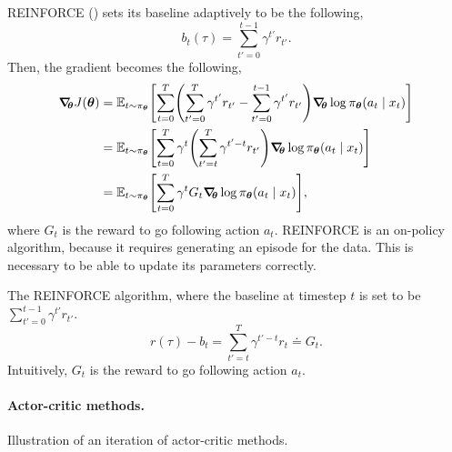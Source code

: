 REINFORCE () sets its baseline adaptively to be the
following, \[
  b_t(\tau) = \sum_{t'=0}^{t-1} \gamma^{t'} r_{t'}
.\]
Then, the gradient becomes the following, 
\begin{align*}
  \grad{J(\vec{\theta})}{\vec{\theta}} &= \E_{t\sim\pi_{\vec{\theta}}} \lft[ \sum_{t=0}^T \lft( \sum_{t'=0}^{T} \gamma^{t'} r_{t'} - \sum_{t'=0}^{t-1} \gamma^{t'} r_{t'} \rgt) \grad{\log \pi_{\vec{\theta}}(a_t\mid x_t)}{\vec{\theta}} \rgt] \\
  &= \E_{t\sim\pi_{\vec{\theta}}} \lft[ \sum_{t=0}^T \gamma^t \lft( \sum_{t'=t}^{T} \gamma^{t'-t} r_{t'} \rgt) \grad{\log \pi_{\vec{\theta}}(a_t\mid x_t)}{\vec{\theta}} \rgt] \\
  &= \E_{t\sim\pi_{\vec{\theta}}} \lft[ \sum_{t=0}^T \gamma^t G_t \grad{\log \pi_{\vec{\theta}}(a_t\mid x_t)}{\vec{\theta}} \rgt]
,\end{align*}
where $G_t$ is the reward to go following action $a_t$. REINFORCE is an
on-policy algorithm, because it requires generating an episode for the data.
This is necessary to be able to update its parameters correctly.

\begin{algorithm}[t]
  \begin{algorithmic}[1]
      \Repeat
        \EndFor
    \EndFunction
  \end{algorithmic}
  \caption{The REINFORCE algorithm, where the baseline at timestep $t$ is set to
  be $\sum_{t'=0}^{t-1} \gamma^{t'}r_{t'}$. \[ r(\tau) - b_t =
  \sum_{t'=t}^T \gamma^{t'-t} r_t \doteq G_t .\] Intuitively, $G_t$ is the reward to go
  following action $a_t$.}
  \label{alg:reinforce}
\end{algorithm}

\paragraph{Actor-critic methods.}

\begin{marginfigure}
    \centering
    \caption{Illustration of an iteration of actor-critic methods.}
    \label{fig:actor-critic}
\end{marginfigure}

